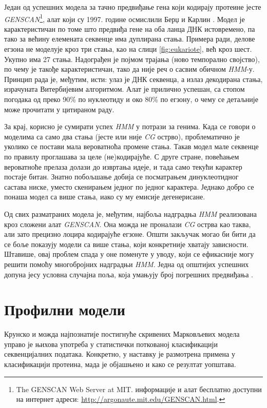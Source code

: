 \documentclass[12pt,oneside]{memoir}
\begin{document}
\begin{CJK}{UTF8}{ipxm}
Један од успешних модела за тачно предвиђање гена који кодирају протеине јесте \textit{GENSCAN}\footnote{The GENSCAN Web Server at MIT. информације и алат бесплатно доступни на интернет адреси: \url{http://argonaute.mit.edu/GENSCAN.html}.}, алат који су 1997. године осмислили Берџ и Карлин \cite{burge1997}. Модел је карактеристичан по томе што предвиђа гене на оба ланца ДНК истовремено, па тако за већину елемената секвенце има дуплирана стања. Примера ради, делове егзона не моделује кроз три стања, као на слици \ref{fig:eukariote}, већ кроз шест. Укупно има 27 стања. Надограђен је појмом трајања (ново темпорално својство), по чему је такође карактеристичан, тако да није реч о сасвим обичном \textit{HMM}-у. Принцип рада је, међутим, исти: улаз је ДНК секвенца, а излаз декодирана стања, израчуната Витербијевим алгоритмом. Алат је прилично успешан, са стопом погодака од преко 90\% по нуклеотиду и око 80\% по егзону, о чему се детаљније може прочитати у цитираном раду.

За крај, корисно је сумирати успех \textit{HMM} у потрази за генима. Када се говори о моделима са само два стања (јесте или није \textit{CG} острво), проблематично је уколико се постави мала вероватноћа промене стања. Такав модел мале секвенце по правилу проглашава за целе (не)кодирајуће. С друге стране, повећањем вероватноће прелаза долази до извртања идеје, и тада само текући карактер постаје битан. Знатно побољшање добија се посматрањем динуклеотидног састава ниске, уместо скенирањем једног по једног карактера. Једнако добро се понаша модел са више стања, иако су му емисије дегенерисане.

Од свих разматраних модела је, међутим, најбоља надградња \textit{HMM} реализована кроз сложени алат \textit{GENSCAN}. Она можда не проналази \textit{CG} острва као таква, али зато прецизно лоцира кодирајуће егзоне. Општи закључак могао би бити да се боље показују модели са више стања, који конкретније хватају зависности. Штавише, овај проблем спада у оне поменуте у уводу, који се ефикасније могу решити помоћу многобројних надградњи \textit{HMM}. Једна од општијих успешних допуна јесу условна случајна поља, која умањују број погрешних предвиђања \cite{decaprio2007}.

\section{Профилни модели}
Крунско и можда најпознатије постигнуће скривених Марковљевих модела управо је њихова употреба у статистички поткованој класификацији секвенцијалних података. Конкретно, у наставку је размотрена примена у класификацији протеина, мада је објашњено и како се резултат уопштава.


\end{CJK}
\end{document}
